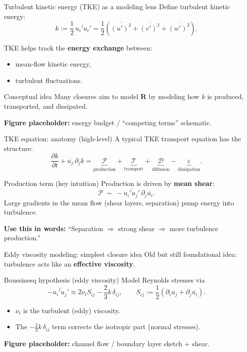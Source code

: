 \documentclass[aspectratio=169]{beamer}
\newcommand{\avg}[1]{\overline{#1}}
\begin{document}
\begin{frame}{Turbulent kinetic energy (TKE) as a modeling lens}
Define turbulent kinetic energy:
\[
k := \frac12\,\avg{u_i' u_i'} = \frac12\left(\avg{(u')^2}+\avg{(v')^2}+\avg{(w')^2}\right).
\]

TKE helps track the \textbf{energy exchange} between:
\begin{itemize}
  \item mean-flow kinetic energy,
  \item turbulent fluctuations.
\end{itemize}

\begin{block}{Conceptual idea}
Many closures aim to model $\bm{R}$ by modeling how $k$ is produced, transported, and dissipated.
\end{block}

\textbf{Figure placeholder:} energy budget / ``competing terms'' schematic.
\end{frame}

\begin{frame}{TKE equation: anatomy (high-level)}
A typical TKE transport equation has the structure:
\[
\frac{\partial k}{\partial t} + \avg{u_j}\,\partial_j k
=
\underbrace{\mathcal{P}}_{\text{production}}
+\underbrace{\mathcal{T}}_{\text{transport}}
+\underbrace{\mathcal{D}}_{\text{diffusion}}
-\underbrace{\varepsilon}_{\text{dissipation}}.
\]

\begin{block}{Production term (key intuition)}
Production is driven by \textbf{mean shear}:
\[
\mathcal{P}\ \sim\ -\avg{u_i' u_j'}\,\partial_j \avg{u_i}.
\]
Large gradients in the mean flow (shear layers, separation) pump energy into turbulence.
\end{block}

\textbf{Use this in words:} ``Separation $\Rightarrow$ strong shear $\Rightarrow$ more turbulence production.''
\end{frame}

\begin{frame}{Eddy viscosity modeling: simplest closure idea}
Old but still foundational idea: turbulence acts like an \textbf{effective viscosity}.

\begin{block}{Boussinesq hypothesis (eddy viscosity)}
Model Reynolds stresses via
\[
-\avg{u_i' u_j'}
\approx
2\nu_t S_{ij} - \frac{2}{3}k\,\delta_{ij},
\qquad
S_{ij}:=\frac12(\partial_i \avg{u_j}+\partial_j \avg{u_i}).
\]
\end{block}

\begin{itemize}
  \item $\nu_t$ is the turbulent (eddy) viscosity.
  \item The $-\tfrac{2}{3}k\,\delta_{ij}$ term corrects the isotropic part (normal stresses).
\end{itemize}

\textbf{Figure placeholder:} channel flow / boundary layer sketch + shear.
\end{frame}
\end{document}
